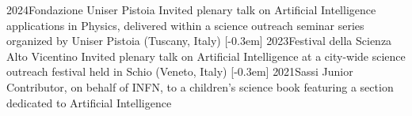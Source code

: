\documentclass[
  a4paper, 
]{fortysecondscv}
\begin{document}
\vspace{1em}

\vspace{-0.5em}

\begin{cvtable}[2]
      {2024}{Fondazione Uniser Pistoia}
      {Invited plenary talk on Artificial Intelligence applications in Physics, delivered within a science outreach seminar series organized by Uniser Pistoia (Tuscany, Italy)}
    [-0.3em]
      {2023}{Festival della Scienza Alto Vicentino}
      {Invited plenary talk on Artificial Intelligence at a city-wide science outreach festival held in Schio (Veneto, Italy)}
    [-0.3em]
      {2021}{Sassi Junior}
      {Contributor, on behalf of INFN, to a children’s science book featuring a section dedicated to Artificial Intelligence}
\end{cvtable}




\cvsignature
\end{document}
